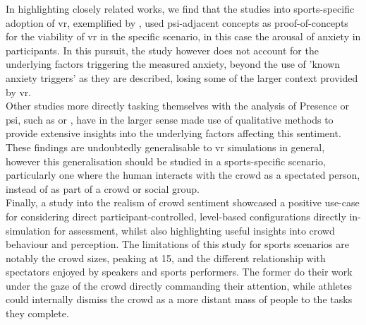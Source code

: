 In highlighting closely related works, we find that the studies into sports-specific adoption of \gls{vr}, exemplified by \cite{stinson-2014-feasibility}, used \gls{psi}-adjacent concepts as proof-of-concepts for the viability of \gls{vr} in the specific scenario, in this case the arousal of anxiety in participants. In this pursuit, the study however does not account for the underlying factors triggering the measured anxiety, beyond the use of 'known anxiety triggers' as they are described, losing some of the larger context provided by \gls{vr}.\\
Other studies more directly tasking themselves with the analysis of Presence or \gls{psi}, such as \cite{riches-2019-factors} or \cite{slater-2023-sentiment}, have in the larger sense made use of qualitative methods to provide extensive insights into the underlying factors affecting this sentiment. These findings are undoubtedly generalisable to \gls{vr} simulations in general, however this generalisation should be studied in a sports-specific scenario, particularly one where the human interacts with the crowd as a spectated person, instead of as part of a crowd or social group.\\
Finally, a study into the realism of crowd sentiment showcased a positive use-case for considering direct participant-controlled, level-based configurations directly in-simulation for assessment, whilst also highlighting useful insights into crowd behaviour and perception. The limitations of this study for sports scenarios are notably the crowd sizes, peaking at 15, and the different relationship with spectators enjoyed by speakers and sports performers. The former do their work under the gaze of the crowd directly commanding their attention, while athletes could internally dismiss the crowd as a more distant mass of people to the tasks they complete. \\

